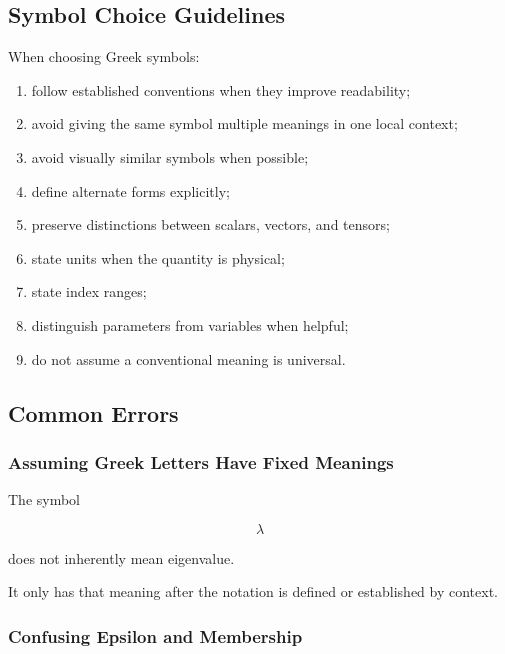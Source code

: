 \subsection{Symbol Choice Guidelines}
\label{subsec:greek-symbol-choice-guidelines}

When choosing Greek symbols:

\begin{enumerate}
    \item follow established conventions when they improve readability;
    \item avoid giving the same symbol multiple meanings in one local context;
    \item avoid visually similar symbols when possible;
    \item define alternate forms explicitly;
    \item preserve distinctions between scalars, vectors, and tensors;
    \item state units when the quantity is physical;
    \item state index ranges;
    \item distinguish parameters from variables when helpful;
    \item do not assume a conventional meaning is universal.
\end{enumerate}

\subsection{Common Errors}
\label{subsec:greek-alphabet-common-errors}

\subsubsection{Assuming Greek Letters Have Fixed Meanings}

The symbol

\[
\lambda
\]

does not inherently mean eigenvalue.

It only has that meaning after the notation is defined or established by
context.

\subsubsection{Confusing Epsilon and Membership}

